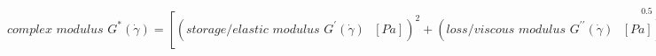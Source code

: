 \documentclass{article}
\begin{document}
\begin{dmath}
\textit{complex modulus } G^*(\dot{\gamma}) = \left[ \left( \textit{storage/elastic modulus } G^{\prime}(\dot{\gamma}) \textit{ } [Pa] \right)^2 + \left( \textit{loss/viscous modulus } G^{\prime\prime}(\dot{\gamma}) \textit{ } [Pa] \right)^2 \right]^{0.5}
\end{dmath}
\end{document}
